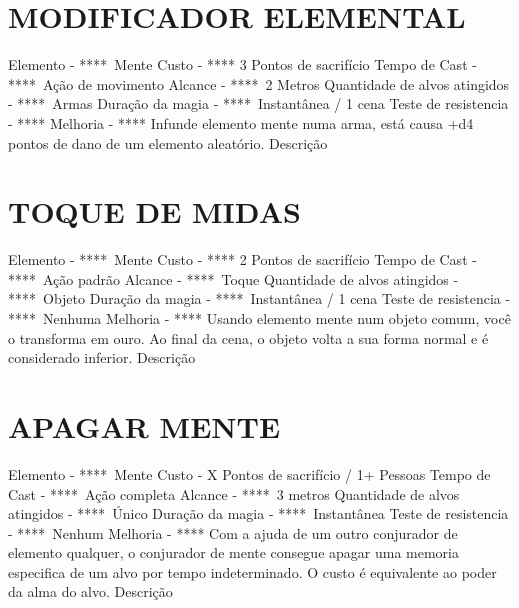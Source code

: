 \documentclass{article}%
\begin{document}
%
\section{MODIFICADOR ELEMENTAL}%
\label{sec:MODIFICADORELEMENTAL}%
Elemento {-} ****~Mente\newline%
Custo {-} **** 3 Pontos de sacrifício\newline%
Tempo de Cast {-} ****~Ação de movimento\newline%
Alcance {-} ****~2 Metros\newline%
Quantidade de alvos atingidos {-} ****~Armas\newline%
Duração da magia {-} ****~Instantânea / 1 cena\newline%
Teste de resistencia {-} ****\newline%
Melhoria {-} **** Infunde elemento mente numa arma, está causa +d4 pontos de dano de um elemento aleatório.\newline%
Descrição \newline%

%
\section{TOQUE DE MIDAS}%
\label{sec:TOQUEDEMIDAS}%
Elemento {-} ****~Mente\newline%
Custo {-} **** 2 Pontos de sacrifício\newline%
Tempo de Cast {-} ****~Ação padrão\newline%
Alcance {-} ****~Toque\newline%
Quantidade de alvos atingidos {-} ****~Objeto\newline%
Duração da magia {-} ****~Instantânea / 1 cena\newline%
Teste de resistencia {-} ****~Nenhuma\newline%
Melhoria {-} **** Usando elemento mente num objeto comum, você o transforma em ouro. Ao final da cena, o objeto volta a sua forma normal e é considerado inferior.\newline%
Descrição \newline%

%
\section{APAGAR MENTE}%
\label{sec:APAGARMENTE}%
Elemento {-} ****~Mente\newline%
Custo {-}  X Pontos de sacrifício / 1+ Pessoas\newline%
Tempo de Cast {-} ****~Ação completa\newline%
Alcance {-} ****~3 metros\newline%
Quantidade de alvos atingidos {-} ****~Único\newline%
Duração da magia {-} ****~Instantânea\newline%
Teste de resistencia {-} ****~Nenhum\newline%
Melhoria {-} **** Com a ajuda de um outro conjurador de elemento qualquer, o conjurador de mente consegue apagar uma memoria especifica de um alvo por tempo indeterminado. O custo é equivalente ao poder da alma do alvo.\newline%
Descrição \newline%
\end{document}

